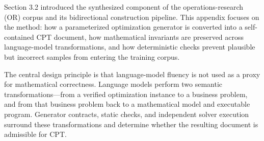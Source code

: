 Section 3.2 introduced the synthesized component of the operations-research
(OR) corpus and its bidirectional construction pipeline.  This appendix focuses
on the method: how a parameterized optimization generator is converted into a
self-contained CPT document, how mathematical invariants are preserved across
language-model transformations, and how deterministic checks prevent plausible
but incorrect samples from entering the training corpus.

The central design principle is that language-model fluency is not used as a
proxy for mathematical correctness.  Language models perform two semantic
transformations---from a verified optimization instance to a business problem,
and from that business problem back to a mathematical model and executable
program.  Generator contracts, static checks, and independent solver execution
surround these transformations and determine whether the resulting document is
admissible for CPT.

